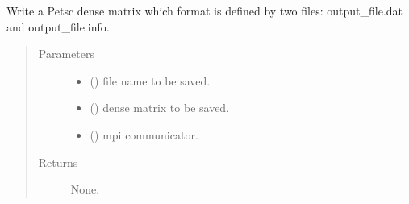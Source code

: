 \documentclass[letterpaper,10pt,english]{sphinxmanual}
\begin{document}
\begin{fulllineitems}
\label{\detokenize{petgem/parallel:petgem.parallel.writeDenseMatrix}}
Write a Petsc dense matrix which format is defined by two files: output\_file.dat and output\_file.info.
\begin{quote}\begin{description}
\item[{Parameters}] \leavevmode\begin{itemize}
\item {} 
 () \textendash{} file name to be saved.

\item {} 
 () \textendash{} dense matrix to be saved.

\item {} 
 () \textendash{} mpi communicator.

\end{itemize}

\item[{Returns}] \leavevmode
None.

\end{description}\end{quote}

\end{fulllineitems}

\end{document}
